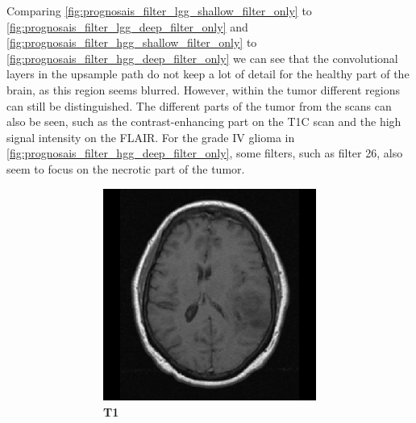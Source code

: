 \begin{subappendices}
Comparing \cref{fig:prognosais_filter_lgg_shallow_filter_only} to \cref{fig:prognosais_filter_lgg_deep_filter_only} and \cref{fig:prognosais_filter_hgg_shallow_filter_only} to \cref{fig:prognosais_filter_hgg_deep_filter_only} we can see that the convolutional layers in the upsample path do not keep a lot of detail for the healthy part of the brain, as this region seems blurred.
However, within the \gls{tumor} different regions can still be distinguished.
The different parts of the \gls{tumor} from the scans can also be seen, such as the contrast-enhancing part on the \gls{T1C} scan and the high signal intensity on the \gls{FLAIR}.
For the grade IV glioma in \cref{fig:prognosais_filter_hgg_deep_filter_only}, some filters, such as filter 26, also seem to focus on the necrotic part of the \gls{tumor}.

\begin{figure}
    \centering
    \begin{subfigure}[b]{0.77\textwidth}
        \centering
        \begin{subfigure}[b]{0.24\textwidth}
        \includegraphics[width=\textwidth]{Figures/TCGA-DU-6400_T1.png}
        \caption*{\normalfont \textbf{\acrshort{T1}}\nopunct}
        \end{subfigure}
        \hfill
        \begin{subfigure}[b]{0.24\textwidth}

\end{subfigure}
\end{subfigure}
\end{figure}
\end{subappendices}
